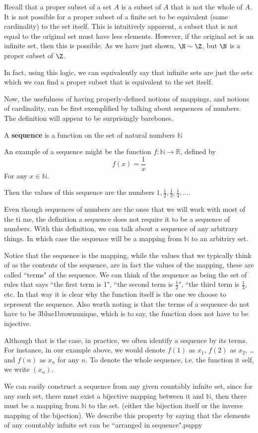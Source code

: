 \documentclass[../../templates/section]{subfiles}
\begin{document}
\begin{remark}
Recall that a proper subset of a set $A$ is a subset of $A$ that is not the
whole of $A$.  It is not possible for a proper subset of a finite set to be
equivalent (same cardinality) to the set itself. This is intuitively apparent,
a subset that is not equal to the original set must have less elements.
However, if the original set is an infinite set, then this is possible. As we
have just shown, $\N \sim \Z$, but $\N$ is a proper subset of $\Z$.
\end{remark}
In fact, using this logic, we can equivalently say that infinite sets are 
just the sets which we can find a proper subset that is equivalent to the 
set itself.

Now, the usefulness of having properly-defined notions of mappings, and notions 
of cardinality, can be first exemplified by talking about sequences of numbers. 
The definition will appear to be surprisingly barebones. 

\begin{definition}
A \textbf{sequence} is a function on the set of natural numbers $\mathbb{N}$
\end{definition}

An example of a sequence might be the function $f:\mathbb{N}\rightarrow \mathbb{R}$, 
defined by 
\[
f(x) = \frac{1}{x}
\]
For any $x\in \mathbb{N}$.

Then the values of this sequence are the numbers $1, \frac{1}{2}, \frac{1}{3}, 
\frac{1}{4}, \dots$. 

Even though sequences of numbers are the ones that we will work with most of 
the ti
me, the definition a sequence does not require it to be a sequence of numbers. 
With this definition, we can talk about a sequence of any arbitrary things. 
In which 
case the sequence will be a mapping from $\mathbb{N}$ to an arbitriry set.

Notice that the sequence is the mapping, while the values that we typically think 
of as the contents of the sequence, are in fact the values of the mapping, 
these are called  ``terms" of the sequence. We can think of the sequence as being 
the set of rules that says ``the first term is 1", ``the second term is $\frac{1}
{2}$", ``the third term is $\frac{1}{3}$, etc. In that way it is clear why the 
function itself is the one we choose to represent the sequence. Also worth noting 
is that the terms of a sequence do not have to be 3blue1brownunique, which is to 
say, the function does not have to be injective. 

Although that is the case, in practice, we often identify a sequence by its terms. 
For instance, in our example above, we would denote $f(1)$ as $x_1$, $f(2)$ as 
$x_2$, \dots and $f(n)$ as $x_n$ for any $n$. To denote the whole sequence, 
i.e. the function it self, we write $(x_n)$.

We can easily construct a sequence from any given countably infnite set, since 
for any such set, there must exist a bijective mapping between it and $\mathbb{N}$, 
then there must be a mapping from $\mathbb{N}$ to the set. (either the bijection 
itself or the inverse mapping of the bijection). We describe this property by 
saying that the elements of any countably infnite set can be ``arranged in sequence".puppy
\end{document}
